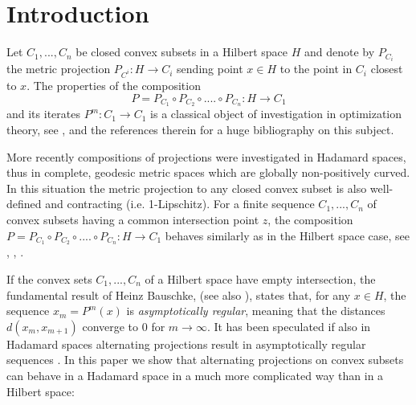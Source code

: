 \documentclass[12pt,leqno]{amsart}
\numberwithin{equation}{section}
\theoremstyle{remark}
\begin{document}






\section{Introduction}





Let  $C_1,..., C_n $ be closed convex subsets in a Hilbert space $H$ and denote by  $P_{C_i}$ the  metric projection  $P_{C^i} :H\to C_i$ sending point $x\in H$ to the point in $C_i$ closest to $x$.  The properties of the composition 
$$P= P_{C_1}\circ P_{C_2}\circ .... \circ P_{C_n} :H\to C_1$$
and its iterates $P^m :C_1 \to C_1$ is a classical object of investigation
 in optimization theory, see \cite{}, \cite{} and the references therein for a huge bibliography on this subject.






More recently  compositions of projections were investigated in  Hadamard spaces, thus in complete, geodesic metric spaces which are globally non-positively curved.    In this situation the metric projection to any closed convex subset is also well-defined and contracting (i.e. 1-Lipschitz).    For a finite sequence $C_1,...,C_n$ of convex subsets having a common intersection point $z$,   the composition $P=  P_{C_1}\circ P_{C_2}\circ .... \circ P_{C_n} :H\to C_1$ behaves similarly as in the Hilbert space case, see \cite{asymptotic}, \cite{Bac2}, \cite{Bac}.
  

If the convex sets $C_1,...,C_n$ of a Hilbert space have empty intersection, the fundamental result of Heinz Bauschke, \cite{Bauschke}  (see also \cite{Kohlenbach}),   
 states that, for any $x\in H$, the sequence $x_m=P^m (x)$  is \emph{asymptotically regular},
 meaning that the distances $d(x_m,x_{m+1})$ converge to $0$ for $m\to \infty$.
It has been speculated if   also in Hadamard spaces alternating projections result in asymptotically regular sequences \cite[Problem 6.13]{Bac}.
In this paper we show that alternating projections on convex subsets can behave in a Hadamard space in a much more complicated  way than in a Hilbert space:
\end{document}
